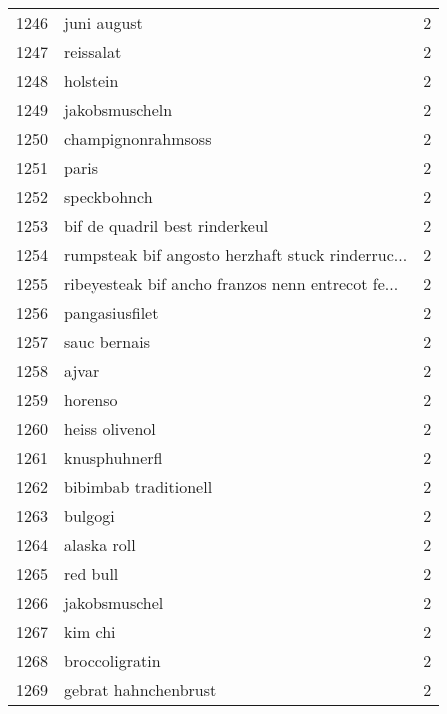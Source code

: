 \begin{tabular}{llr}
1246 &                                        juni august &      2 \\
1247 &                                          reissalat &      2 \\
1248 &                                           holstein &      2 \\
1249 &                                     jakobsmuscheln &      2 \\
1250 &                                 champignonrahmsoss &      2 \\
1251 &                                              paris &      2 \\
1252 &                                        speckbohnch &      2 \\
1253 &                     bif de quadril best rinderkeul &      2 \\
1254 &  rumpsteak bif angosto herzhaft stuck rinderruc... &      2 \\
1255 &  ribeyesteak bif ancho franzos nenn entrecot fe... &      2 \\
1256 &                                     pangasiusfilet &      2 \\
1257 &                                       sauc bernais &      2 \\
1258 &                                              ajvar &      2 \\
1259 &                                            horenso &      2 \\
1260 &                                     heiss olivenol &      2 \\
1261 &                                      knusphuhnerfl &      2 \\
1262 &                              bibimbab traditionell &      2 \\
1263 &                                            bulgogi &      2 \\
1264 &                                        alaska roll &      2 \\
1265 &                                           red bull &      2 \\
1266 &                                      jakobsmuschel &      2 \\
1267 &                                            kim chi &      2 \\
1268 &                                     broccoligratin &      2 \\
1269 &                               gebrat hahnchenbrust &      2 \\

\end{tabular}
